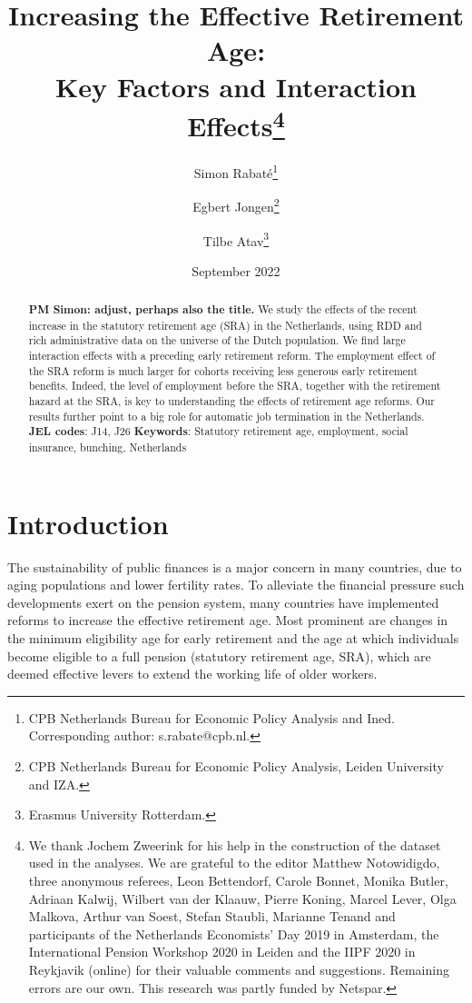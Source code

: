 \documentclass[12pt,a4paper]{article}
\title{Increasing the Effective Retirement Age:\\ Key Factors and Interaction Effects\thanks{We thank Jochem Zweerink for his help in the construction of the dataset used in the analyses. We are grateful to the editor Matthew Notowidigdo, three anonymous referees, Leon Bettendorf, Carole Bonnet, Monika Butler, Adriaan Kalwij, Wilbert van der Klaauw, Pierre Koning, Marcel Lever, Olga Malkova, Arthur van Soest, Stefan Staubli, Marianne Tenand and participants of the Netherlands Economists' Day 2019 in Amsterdam, the International Pension Workshop 2020 in Leiden and the IIPF 2020 in Reykjavik (online) for their valuable comments and suggestions. Remaining errors are our own. This research was partly funded by Netspar.}
}
\author{Simon Rabaté\thanks{CPB Netherlands Bureau for Economic Policy Analysis and Ined. Corresponding author: s.rabate@cpb.nl.  } \and Egbert Jongen\thanks{CPB Netherlands Bureau for Economic Policy Analysis, Leiden University and IZA.} \and Tilbe Atav\thanks{Erasmus University Rotterdam.} }
\date{September 2022}
\begin{document}
	
\maketitle
\thispagestyle{empty}

\begin{abstract}
	
\noindent \textbf{PM Simon: adjust, perhaps also the title.} We study the effects of the recent increase in the statutory retirement age (SRA) in the Netherlands, using RDD and rich administrative data on the universe of the Dutch population. We find large interaction effects with a preceding early retirement reform. The employment effect of the SRA reform is much larger for cohorts receiving less generous early retirement benefits. Indeed, the level of employment before the SRA, together with the retirement hazard at the SRA, is key to understanding the effects of retirement age reforms. Our results further point to a big role for automatic job termination in the Netherlands. 
\newline
\\
\textbf{JEL codes}:  J14, J26 \newline
\textbf{Keywords}: Statutory retirement age, employment, social insurance, bunching, Netherlands \newline
\end{abstract}

\clearpage
{}

\newpage

\section{Introduction}

The sustainability of public finances is a major concern in many countries, due to aging populations and lower fertility rates. %
To alleviate the financial pressure such developments exert on the pension system, many countries have implemented reforms to increase the effective retirement age. Most prominent are changes in the minimum eligibility age for early retirement and the age at which individuals become eligible to a full pension (statutory retirement age, SRA),
which are deemed effective levers to extend the working life of older workers. 
\end{document}
